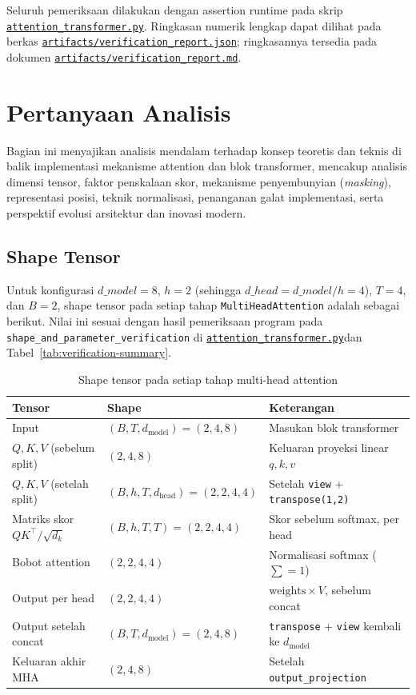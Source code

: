 \documentclass[12pt,a4paper]{article}
\newcommand{\code}[1]{\texttt{\small #1}}
\newcommand{\sourcecodelink}{\href{https://github.com/Universitas-Cakrawala/tugas-deep-learning-sesi-10/blob/main/attention_transformer.py}{\nolinkurl{attention_transformer.py}}}
\newcommand{\verificationjsonlink}{\href{https://github.com/Universitas-Cakrawala/tugas-deep-learning-sesi-10/blob/main/artifacts/verification_report.json}{\nolinkurl{artifacts/verification_report.json}}}
\newcommand{\verificationmdlink}{\href{https://github.com/Universitas-Cakrawala/tugas-deep-learning-sesi-10/blob/main/artifacts/verification_report.md}{\nolinkurl{artifacts/verification_report.md}}}
\begin{document}
Seluruh pemeriksaan dilakukan dengan assertion runtime pada skrip
\sourcecodelink. Ringkasan numerik lengkap dapat dilihat pada berkas
\verificationjsonlink; ringkasannya tersedia pada dokumen \verificationmdlink.

\section{Pertanyaan Analisis}

Bagian ini menyajikan analisis mendalam terhadap konsep teoretis dan teknis di balik implementasi mekanisme attention dan blok transformer, mencakup analisis dimensi tensor, faktor penskalaan skor, mekanisme penyembunyian (\textit{masking}), representasi posisi, teknik normalisasi, penanganan galat implementasi, serta perspektif evolusi arsitektur dan inovasi modern.

\subsection{Shape Tensor}
Untuk konfigurasi $d\_model=8$, $h=2$ (sehingga $d\_head = d\_model/h = 4$),
$T=4$, dan $B=2$, shape tensor pada setiap tahap \texttt{MultiHeadAttention}
adalah sebagai berikut. Nilai ini sesuai dengan hasil pemeriksaan program
pada \code{shape\_and\_parameter\_verification} di
\sourcecodelink dan Tabel~\ref{tab:verification-summary}.

\begin{table}[H]
    \centering
    \caption{Shape tensor pada setiap tahap multi-head attention}
    \label{tab:shape-tensor-analisis}
    \renewcommand{\arraystretch}{1.25}
    \begin{tabularx}{\textwidth}{>{\raggedright\arraybackslash}p{4.2cm} >{\raggedright\arraybackslash}p{4.6cm} >{\raggedright\arraybackslash}X}
        \toprule
        Tensor & Shape & Keterangan \\
        \midrule
        Input & $(B, T, d_{\text{model}}) = (2, 4, 8)$ & Masukan blok transformer \\
        $Q, K, V$ (sebelum split) & $(2, 4, 8)$ & Keluaran proyeksi linear $q, k, v$ \\
        $Q, K, V$ (setelah split) & $(B, h, T, d_{\text{head}}) = (2, 2, 4, 4)$ & Setelah \code{view} + \code{transpose(1,2)} \\
        Matriks skor $QK^\top/\sqrt{d_k}$ & $(B, h, T, T) = (2, 2, 4, 4)$ & Skor sebelum softmax, per head \\
        Bobot attention & $(2, 2, 4, 4)$ & Normalisasi softmax ($\sum = 1$) \\
        Output per head & $(2, 2, 4, 4)$ & $\text{weights} \times V$, sebelum concat \\
        Output setelah concat & $(B, T, d_{\text{model}}) = (2, 4, 8)$ & \code{transpose} + \code{view} kembali ke $d_{\text{model}}$ \\
        Keluaran akhir MHA & $(2, 4, 8)$ & Setelah \code{output\_projection} \\
        \bottomrule
    \end{tabularx}
\end{table}
\end{document}
